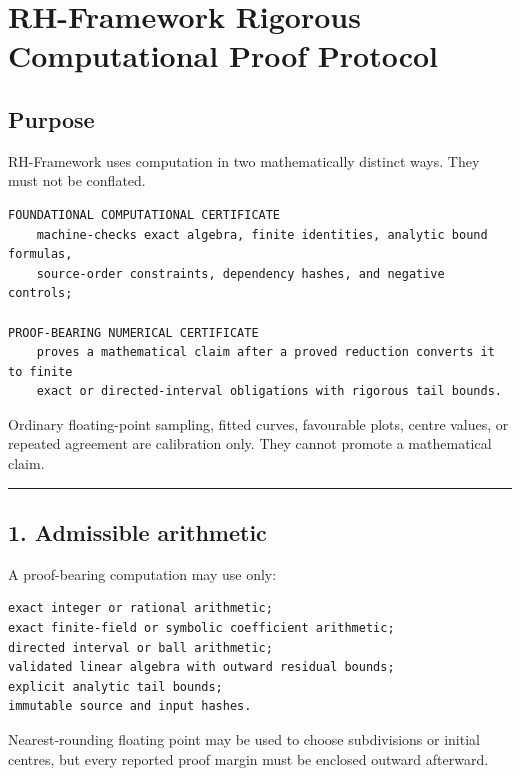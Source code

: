 \hypertarget{rh-framework-rigorous-computational-proof-protocol}{%
\chapter{RH-Framework Rigorous Computational Proof Protocol}\label{rh-framework-rigorous-computational-proof-protocol}}

\hypertarget{purpose}{%
\section{Purpose}\label{purpose}}

RH-Framework uses computation in two mathematically distinct ways. They must not
be conflated.

\begin{verbatim}
FOUNDATIONAL COMPUTATIONAL CERTIFICATE
    machine-checks exact algebra, finite identities, analytic bound formulas,
    source-order constraints, dependency hashes, and negative controls;

PROOF-BEARING NUMERICAL CERTIFICATE
    proves a mathematical claim after a proved reduction converts it to finite
    exact or directed-interval obligations with rigorous tail bounds.
\end{verbatim}

Ordinary floating-point sampling, fitted curves, favourable plots, centre
values, or repeated agreement are calibration only. They cannot promote a
mathematical claim.

\begin{center}\rule{0.5\linewidth}{0.5pt}\end{center}

\hypertarget{admissible-arithmetic}{%
\section{1. Admissible arithmetic}\label{admissible-arithmetic}}

A proof-bearing computation may use only:

\begin{verbatim}
exact integer or rational arithmetic;
exact finite-field or symbolic coefficient arithmetic;
directed interval or ball arithmetic;
validated linear algebra with outward residual bounds;
explicit analytic tail bounds;
immutable source and input hashes.
\end{verbatim}

Nearest-rounding floating point may be used to choose subdivisions or initial
centres, but every reported proof margin must be enclosed outward afterward.

